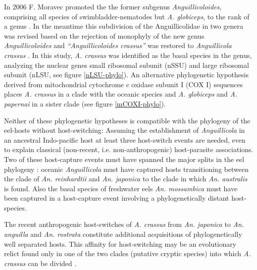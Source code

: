 In 2006 F. Moravec promoted the the former subgenus
\textit{Anguillicoloides}, comprising all species of
swimbladder-nematodes but \textit{A. globiceps}, to the rank of a
genus \cite{moravec_anguillicoloides}. In the meantime this
subdivision of the Anguillicolidae in two genera was revised based on
the rejection of monophyly of the new genus \textit{Anguillicoloides}
and \textit{``Anguillicoloides crassus''} was restored to
\textit{Anguillicola crassus} \cite{dl_py}. In this study,
\textit{A. crassus} was identified as the basal species in the genus,
analyzing the nuclear genes small ribosomal subunit (nSSU) and large
ribosomal subunit (nLSU, see figure \ref{nLSU-phylo}). An alternative
phylogenetic hypothesis derived from mitochondrial cytochrome c
oxidase subunit I (COX I) sequences places \textit{A. crassus} in a
clade with the oceanic species and \textit{A. globiceps} and
\textit{A. papernai} in a sister clade (see figure \ref{mCOXI-phylo}).

Neither of these phylogenetic hypotheses is compatible with the
phylogeny of the eel-hosts without host-switching: Assuming the
establishment of \textit{Anguillicola} in an ancestral Indo-pacific
host at least three host-switch events are needed, even to explain
classical (non-recent, i.e. non-anthropogenic) host-parasite
associations. Two of these host-capture events must have spanned the
major splits in the eel phylogeny \cite{minegishi_molecular_2005}:
oceanic \textit{Anguillicola} must have captured hosts transitioning
between the clade of \textit{An. reinhardtii} and
\textit{An. japonica} to the clade in which \textit{An. australis} is
found. Also the basal species of freshwater eels
\textit{An. mossambica} must have been captured in a host-capture
event involving a phylogenetically distant host-species.


The recent anthropogenic host-switches of \textit{A. crassus} from
\textit{An. japonica} to \textit{An. anguilla} and
\textit{An. rostrata} constitute additional acquisitions of
phylogenetically well separated hosts. This affinity for
host-switching may be an evolutionary relict found only in one of the
two clades (putative cryptic species) into which \textit{A. crassus}
can be divided \cite{dl_py}.

